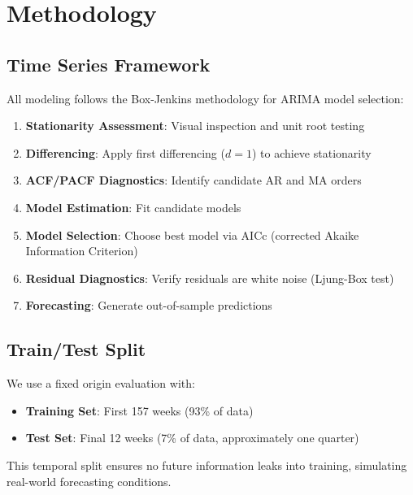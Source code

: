 \documentclass[12pt]{article}
\begin{document}
\newpage

\section{Methodology}
\label{sec:methodology}

\subsection{Time Series Framework}

All modeling follows the Box-Jenkins methodology for ARIMA model selection:

\begin{enumerate}
    \item \textbf{Stationarity Assessment}: Visual inspection and unit root testing
    \item \textbf{Differencing}: Apply first differencing ($d=1$) to achieve stationarity
    \item \textbf{ACF/PACF Diagnostics}: Identify candidate AR and MA orders
    \item \textbf{Model Estimation}: Fit candidate models
    \item \textbf{Model Selection}: Choose best model via AICc (corrected Akaike Information Criterion)
    \item \textbf{Residual Diagnostics}: Verify residuals are white noise (Ljung-Box test)
    \item \textbf{Forecasting}: Generate out-of-sample predictions
\end{enumerate}

\subsection{Train/Test Split}

We use a fixed origin evaluation with:
\begin{itemize}
    \item \textbf{Training Set}: First 157 weeks (93\% of data)
    \item \textbf{Test Set}: Final 12 weeks (7\% of data, approximately one quarter)
\end{itemize}

This temporal split ensures no future information leaks into training, simulating real-world forecasting conditions.
\end{document}
